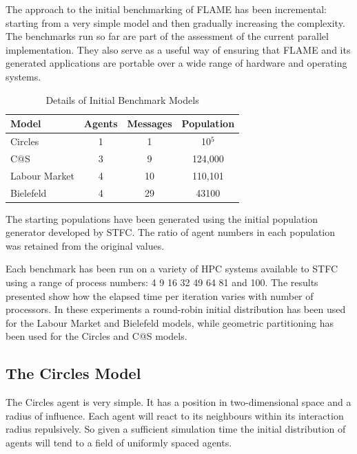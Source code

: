 \label{app:initial-benchmarks}
The approach to the initial benchmarking of FLAME has been incremental: starting from a very simple model and then gradually increasing the complexity. The benchmarks run so far are part of the assessment of the current parallel implementation. They also serve as a useful way of ensuring that FLAME and its generated applications are portable over a wide range of hardware and operating systems. 

\begin{table}[ht]
 \centering
  \begin{tabular}{l|ccc}
  Model     & Agents & Messages & Population   \\\hline
   Circles     &   1    &   1      &  10$^5$    \\
   C@S       &   3    &   9      &  124,000 \\
   Labour Market &   4    &   10     &  110,101 \\ 
   Bielefeld     &   4    &   29     &  43100     \\\hline
   \end{tabular}
   \caption{Details of Initial Benchmark Models}
 \end{table}

The starting populations have been generated using the initial population generator developed by STFC. The ratio of agent numbers in each population was retained from the original values.

Each benchmark has been run on a variety of HPC systems available to STFC using a range of process numbers: 4 9 16 32 49 64 81 and 100. The results presented show how the elapsed time per iteration varies with number of processors. In these experiments a round-robin initial distribution has been used for the Labour Market and Bielefeld models, while geometric partitioning has been used for the Circles and C@S models.

\subsection{The Circles Model}

The Circles agent is very simple. It has a position in two-dimensional space and a radius of influence. Each agent will react to its neighbours within its interaction radius repulsively. So given a sufficient simulation time the initial distribution of agents will tend to a field of uniformly spaced agents.

